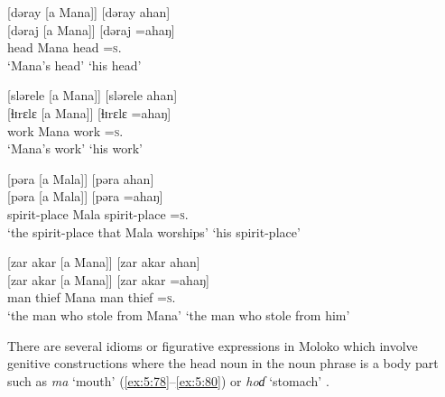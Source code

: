 \ea \label{ex:5:74}
{}[dəray  [a  Mana]]  \hspace{35pt}       [dəray  ahan]\\
\gll  {}[dəraj   [a   Mana]]    \hspace{25pt}   [dəraj  =ahaŋ]\\
      head   {\GEN}  Mana   \hspace{30pt}    head  =\textsc{s}.{\POSS}\\
\glt  ‘Mana’s head’   \hspace{50pt}      ‘his head’
\z

\ea \label{ex:5:75}
{}[slərele  [a  Mana]]   \hspace{32pt}      [slərele    ahan]\\
\gll  {}[ɬɪrɛlɛ   [a   Mana]]   \hspace{30pt}    [ɬɪrɛlɛ  =ahaŋ]\\
      work   {\GEN}  Mana   \hspace{30pt}    work  =\textsc{s}.{\POSS}\\
\glt  ‘Mana’s work’   \hspace{50pt}      ‘his work’
\z

\ea \label{ex:5:76}
{}[pəra  [a  Mala]]   \hspace{100pt}      [pəra  ahan]\\
\gll  {}[pəra   [a  Mala]]  \hspace{65pt}     [pəra    =ahaŋ]\\
      spirit-place   {\GEN}   Mala   \hspace{65pt}              spirit-place  =\textsc{s}.{\POSS}\\
\glt  ‘the spirit-place that Mala worships’  \hspace{5pt}   ‘his spirit-place’
\z

\ea \label{ex:5:77}
{}[zar  akar  [a  Mana]]  \hspace{62pt}     [zar  akar  ahan]\\
\gll  {}[zar   akar   [a   Mana]]  \hspace{50pt}   [zar   akar   =ahaŋ]\\
      man   thief   {\GEN}   Mana   \hspace{50pt}       man  thief  =\textsc{s}.{\POSS}\\
\glt  ‘the man who stole from Mana’ \hspace{10pt}    ‘the man who stole from him’
\z

There are several idioms or figurative expressions in Moloko which involve genitive constructions where the head noun in the noun phrase is a body part such as \textit{ma} ‘mouth’ (\ref{ex:5:78}--\ref{ex:5:80}) or \textit{hoɗ}  ‘stomach’ . 

